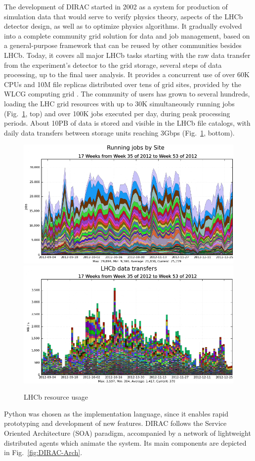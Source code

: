 \documentclass[sort&compress,preprint,3p]{elsarticle}
\begin{document}
The development of DIRAC started in 2002 as a system for production of simulation
data that would serve to verify physics theory, aspects of the LHCb detector design, as
well as to optimize physics algorithms. It gradually evolved into a complete community
grid solution for data and job management, based on a general-purpose framework
that can be reused by other communities besides LHCb. Today, it covers all major
LHCb tasks starting with the raw data transfer from the experiment's detector to
the grid storage, several steps of data processing, up to the final user
analysis. 
It provides a concurrent use of over 60K CPUs and 10M file replicas distributed
over
tens of grid sites, provided by the WLCG computing grid \cite{Bird:2011zz}. The
community of users has grown to several hundreds, loading the 
LHC grid resources with up to 30K simultaneously running jobs
(Fig.~\ref{fig:LHCb-resource-usage}, top) and over 100K jobs executed per day,
during peak processing periods.
About 10PB of data is stored and visible in the LHCb file catalogs, with daily
data transfers between storage units reaching 3Gbps
(Fig.~\ref{fig:LHCb-resource-usage}, bottom).
\begin{figure}
  \centering
  {\label{fig:Job-throughput}\includegraphics[width=0.7\linewidth]{./graphics/Figure1_1.png}}    
  \vfill
  \vspace{14pt}
{\label{fig:Data-transfers}\includegraphics[width =0.7\linewidth]{./graphics/Figure1_2.png}}
  \caption{LHCb resource usage}
  \label{fig:LHCb-resource-usage}
\end{figure}
Python was chosen as the implementation language, since it enables
rapid prototyping and development of new features. DIRAC follows the Service
Oriented Architecture (SOA) paradigm, accompanied by a network of lightweight
distributed agents which animate the system. Its main components are depicted in
Fig.~\ref{fig:DIRAC-Arch}. 
\end{document}
